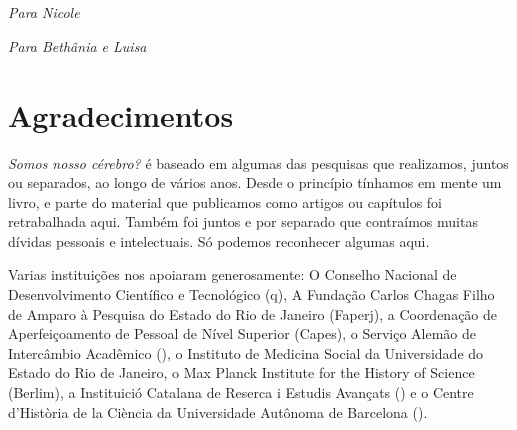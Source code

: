 






\chapter*{}

\vspace*{\fill}

\thispagestyle{empty}
\begin{flushright}
\emph{Para Nicole}\\

\vspace{1cm}

\emph{Para Bethânia e Luisa}\\
\end{flushright}

\chapter{Agradecimentos}

\emph{Somos nosso cérebro?} é baseado em algumas das pesquisas que
realizamos, juntos ou separados, ao longo de vários anos. Desde o
princípio tínhamos em mente um livro, e parte do material que publicamos
como artigos ou capítulos foi retrabalhada aqui. Também foi juntos e por
separado que contraímos muitas dívidas pessoais e intelectuais. Só
podemos reconhecer algumas aqui.

Varias instituições nos apoiaram generosamente: O Conselho Nacional de
Desenvolvimento Científico e Tecnológico (q), A Fundação Carlos
Chagas Filho de Amparo à Pesquisa do Estado do Rio de Janeiro (Faperj),
a Coordenação de Aperfeiçoamento de Pessoal de Nível Superior (Capes), o
Serviço Alemão de Intercâmbio Acadêmico (), o Instituto de Medicina
Social da Universidade do Estado do Rio de Janeiro, o Max Planck
Institute for the History of Science (Berlim), a Instituició Catalana de
Reserca i Estudis Avançats () e o Centre d'Història de la Ciència
da Universidade Autônoma de Barcelona ().

